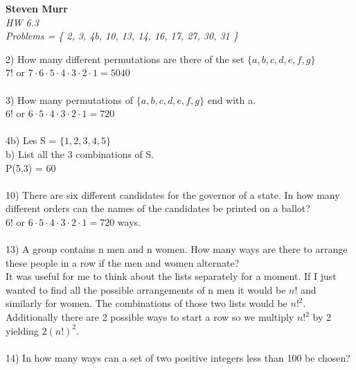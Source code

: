 \documentclass{article}
\begin{document}
\setcounter{totalnumber}{5}
   \begin{flushright}
      \Large\textbf{Steven Murr}\\
      \large\textit{HW 6.3} \\
      \large\textit{ Problems = \{ 2, 3, 4b, 10, 13, 14, 16, 17, 27, 30, 31 \} }
   \end{flushright} 
\begin{flushleft}
\makeatletter%
\setlength{\@fptop}{5pt}
\makeatother
\setlength\parindent{0pt}2) How many different permutations are there of the set $\{a,b,c,d,e,f,g\}$ \\
\setlength\parindent{24pt} $7!$ or $7 \cdot 6 \cdot 5 \cdot 4 \cdot 3 \cdot 2 \cdot 1 = 5040$ \\
~\\
\setlength\parindent{0pt}3) How many permutations of $\{a,b,c,d,e,f,g\}$ end with a.  \\ 
\setlength\parindent{24pt} $6!$ or $6 \cdot 5 \cdot 4 \cdot 3 \cdot 2 \cdot 1 = 720$ \\
~\\
\setlength\parindent{0pt}4b) Les S = $\{ 1,2,3,4,5 \}$ \\
\setlength\parindent{24pt}b) List all the 3 combinations of S. \\
\setlength\parindent{24pt} P(5,3) = 60 \\
~\\
\setlength\parindent{0pt}10) There are six different candidates for the governor of a state.  In how many different orders can the names of the candidates be printed on a ballot? \\
\setlength\parindent{24pt}$6!$ or $6 \cdot 5 \cdot 4 \cdot 3 \cdot 2 \cdot 1 = 720$ ways. \\
~\\
\setlength\parindent{0pt}13) A group contains n men and n women.  How many ways are there to arrange these people in a row if the men and women alternate? \\
\setlength\parindent{24pt}It was useful for me to think about the lists separately for a moment.  If I just wanted to find all the possible arrangements of n men it would be $n!$ and similarly for women.  The combinations of those two lists would be $n!^2$.  Additionally there are 2 possible ways to start a row so we multiply $n!^2$ by 2 yielding $2(n!)^2$. \\
~\\
\setlength\parindent{0pt}14) In how many ways can a set of two positive integers less than 100 be chosen? \\

\end{flushleft}
\end{document}
